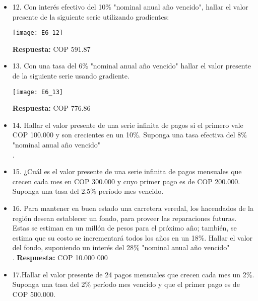 \begin{itemize}
 \item 12. Con interés efectivo del 10\% "nominal anual año vencido", hallar el valor presente de la siguiente serie utilizando gradientes:\\
       \begin{center}
        \texttt{[image: E6\_12]}
       \end{center}
       \textbf{Respuesta:} COP 591.87\\
       \medskip

 \item 13. Con una tasa del 6\% "nominal anual año vencido" hallar el valor presente de la siguiente serie usando gradiente.\\
       \begin{center}
        \texttt{[image: E6\_13]}
       \end{center}
       \textbf{Respuesta:} COP 776.86\\
       \medskip

 \item 14. Hallar el valor presente de una serie infinita de pagos si el primero vale COP 100.000 y son crecientes en un 10\%. Suponga una tasa efectiva del 8\% "nominal anual año vencido"\\.
       \medskip

 \item 15. ¿Cuál es el valor presente de una serie infinita de pagos mensuales que crecen cada mes en COP 300.000 y cuyo primer pago es de COP 200.000. Suponga una tasa del 2.5\% período mes vencido.\\
       \medskip

 \item 16. Para mantener en buen estado una carretera veredal, los hacendados de la región desean establecer un fondo, para proveer las reparaciones futuras. Estas se estiman en un millón de pesos para el próximo año; también, se estima que su costo se incrementará todos los años en un 18\%. Hallar el valor del fondo, suponiendo un interés del 28\% "nominal anual año vencido"\\.
       \textbf{Respuesta:} COP 10.000 000\\
       \medskip

 \item 17.Hallar el valor presente de 24 pagos mensuales que crecen cada mes un 2\%. Suponga una tasa del 2\% período mes vencido y que el primer pago es de COP 500.000.\\
       \medskip


\end{itemize}
